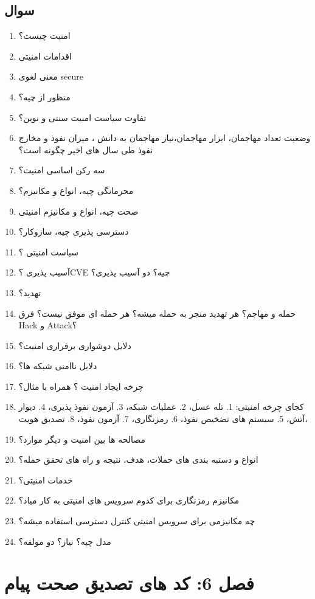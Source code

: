 \documentclass{report}
\begin{document}
	\subsection{سوال}
		\begin{enumerate}
			\item 
			امنیت چیست؟
			\item
			اقدامات امنیتی 
			\item 
			معنی لغوی secure
			\item
			منظور از
			چیه؟
			\item 
			تفاوت سیاست امنیت سنتی و نوین؟
			\item
			وضعیت تعداد مهاجمان، ابزار مهاجمان،نیاز مهاجمان به دانش ، میزان نفوذ و مخارج نفوذ طی سال های اخیر چگونه است؟
			\item
			سه رکن اساسی امنیت؟
			\item 
			محرمانگی چیه، انواع و مکانیزم؟
			\item
			صحت چیه، انواع و مکانیزم امنیتی
			\item 
			دسترسی پذیری چیه، سازوکار؟
			\item
			سیاست امنیتی ؟
			\item
			آسیب پذیری ؟CVE چیه؟ دو آسیب پذیری؟
			\item 
			تهدید؟
			\item
			حمله و مهاجم؟ هر تهدید منجر به حمله میشه؟ هر حمله ای موفق نیست؟ فرق Hack و Attack؟
			\item  
			دلایل دوشواری برقراری امنیت؟
			\item
			دلایل ناامنی شبکه ها؟
			\item
			چرخه ایجاد امنیت ؟ همراه با مثال؟
			\item 
			کجای چرخه امنیتی:
			1. تله عسل،
			2. عملیات شبکه،
			3. آزمون نفوذ پذیری،
			4. دیوار آتش،
			5. سیستم های تضخیص نفوذ،
			6. رمزنگاری،
			7. آزمون نفوذ،	
			8. تصدیق هویت،
			\item 
			مصالحه ها بین امنیت و دیگر موارد؟
			\item
			انواع و دستبه بندی های حملات، هدف، نتیجه و راه های تحقق حمله؟
			\item
			خدمات امنیتی؟
			\item 
			مکانیزم رمزنگاری برای کدوم سرویس های امنیتی به کار میاد؟
			\item
			چه مکانیزمی برای سرویس امنیتی کنترل دسترسی استفاده میشه؟
			\item 
			مدل چیه؟ نیاز؟ دو مولفه؟
		\end{enumerate}
	\section{فصل 6: کد های تصدیق صحت پیام}
	
\end{document}

